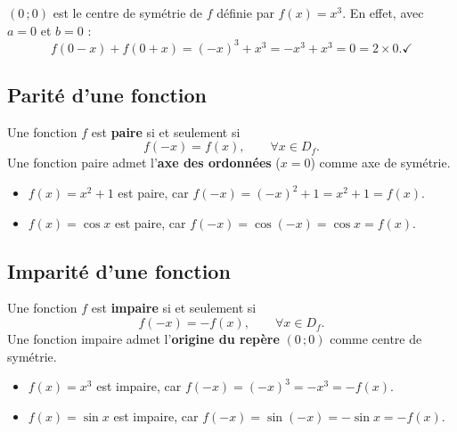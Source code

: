 \documentclass[11pt,a4paper]{article}
\newcommand{\Df}{D_f}
\begin{document}
\begin{exemple}
$(0\,;0)$ est le centre de symétrie de $f$ définie par $f(x)=x^3$. En effet, avec
$a=0$ et $b=0$ :
\[
  f(0-x)+f(0+x)=(-x)^3+x^3=-x^3+x^3=0=2\times 0 . \checkmark
\]
\end{exemple}

\subsection{Parité d'une fonction}

\begin{definition}
Une fonction $f$ est \textbf{paire} si et seulement si
\[
  f(-x)=f(x),\qquad \forall x\in\Df .
\]
Une fonction paire admet l'\textbf{axe des ordonnées} ($x=0$) comme axe de symétrie.
\end{definition}

\begin{exemple}
\begin{itemize}[leftmargin=1.5em,topsep=2pt]
  \item $f(x)=x^2+1$ est paire, car $f(-x)=(-x)^2+1=x^2+1=f(x)$.
  \item $f(x)=\cos x$ est paire, car $f(-x)=\cos(-x)=\cos x=f(x)$.
\end{itemize}
\end{exemple}

\subsection{Imparité d'une fonction}

\begin{definition}
Une fonction $f$ est \textbf{impaire} si et seulement si
\[
  f(-x)=-f(x),\qquad \forall x\in\Df .
\]
Une fonction impaire admet l'\textbf{origine du repère} $(0\,;0)$ comme centre de symétrie.
\end{definition}

\begin{exemple}
\begin{itemize}[leftmargin=1.5em,topsep=2pt]
  \item $f(x)=x^3$ est impaire, car $f(-x)=(-x)^3=-x^3=-f(x)$.
  \item $f(x)=\sin x$ est impaire, car $f(-x)=\sin(-x)=-\sin x=-f(x)$.
\end{itemize}
\end{exemple}
\end{document}
